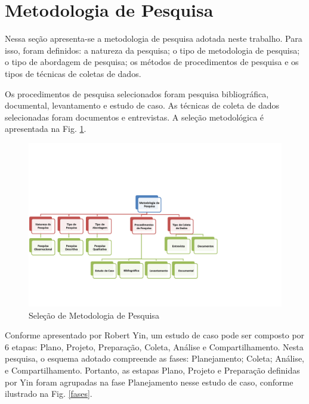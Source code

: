 \section[Metodologia de Pesquisa]{Metodologia de Pesquisa}

Nessa seção apresenta-se a metodologia de pesquisa adotada neste trabalho.
Para isso, foram definidos: a natureza da pesquisa; o tipo de metodologia de pesquisa; o tipo de abordagem de pesquisa; os métodos de
procedimentos de pesquisa e os tipos de técnicas de coletas de dados.

Os procedimentos de pesquisa selecionados foram pesquisa bibliográfica,
documental, levantamento e estudo de caso. As técnicas de coleta de dados selecionadas foram
documentos e entrevistas. A seleção
metodológica é apresentada na Fig. \ref{met}.

	\begin{figure}[h]
		\centering
		
			\includegraphics[scale=0.7]{figuras/metodologiapesquisa.png}
		\caption{Seleção de Metodologia de Pesquisa}
		\label{met}
	\end{figure}

Conforme apresentado por Robert Yin, um estudo de caso pode ser composto por 6 etapas: Plano, Projeto, Preparação, Coleta, Análise e Compartilhamento. Nesta pesquisa, o esquema adotado compreende as fases: Planejamento; Coleta; Análise, e Compartilhamento. Portanto, as estapas Plano, Projeto e Preparação definidas por Yin foram agrupadas na fase Planejamento nesse estudo de caso, conforme ilustrado na Fig. \ref{fases}.


